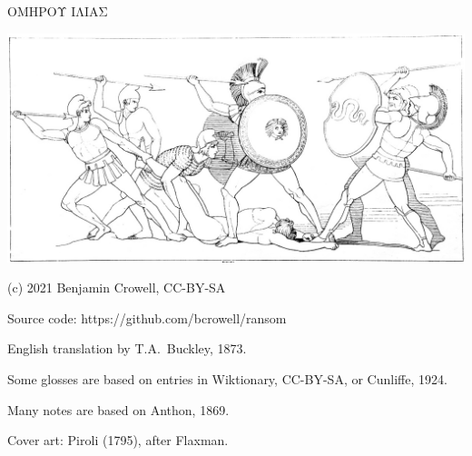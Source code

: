 \pagestyle{empty}

\vspace{25mm} %

\begin{center}

{\huge ΟΜΗΡΟΥ ΙΛΙΑΣ }

\vspace{10mm}

\includegraphics{iliad/figs/ajax-and-patroclus-body}

\vfill

\end{center}

\pagebreak

(c) 2021 Benjamin Crowell, CC-BY-SA

Source code: https://github.com/bcrowell/ransom

English translation by T.A.~Buckley, 1873.

Some glosses are based on entries in Wiktionary, CC-BY-SA, or Cunliffe, 1924.

Many notes are based on Anthon, 1869.

Cover art: Piroli (1795), after Flaxman.





